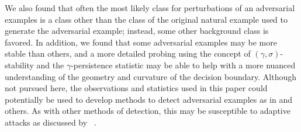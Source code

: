 We also found that often the most likely class for perturbations of an adversarial examples is a class other than the class of the original natural example used to generate the adversarial example; instead, some other background class is favored. In addition, we found that some adversarial examples may be more stable than others, and a more detailed probing using the concept of $(\gamma,\sigma)$-stability and the $\gamma$-persistence statistic may be able to help with a more nuanced understanding of the geometry and curvature of the decision boundary. Although not pursued here, the observations and statistics used in this paper could potentially be used to develop methods to detect adversarial examples as in \citep{crecchi2019,frosst2018,hosseini2019odds,Lee2018ASU,qin2020,roth19aodds} and others. As with other methods of detection, this may be susceptible to adaptive attacks as discussed by ~\citet{tramer2020adaptive}. 

